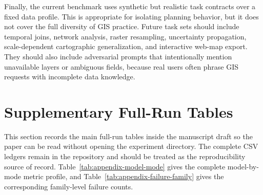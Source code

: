 \documentclass[]{interact}
\begin{document}
Finally, the current benchmark uses synthetic but realistic task contracts over a fixed data profile. This is appropriate for isolating planning behavior, but it does not cover the full diversity of GIS practice. Future task sets should include temporal joins, network analysis, raster resampling, uncertainty propagation, scale-dependent cartographic generalization, and interactive web-map export. They should also include adversarial prompts that intentionally mention unavailable layers or ambiguous fields, because real users often phrase GIS requests with incomplete data knowledge.

\section{Supplementary Full-Run Tables}

This section records the main full-run tables inside the manuscript draft so the paper can be read without opening the experiment directory. The complete CSV ledgers remain in the repository and should be treated as the reproducibility source of record. Table~\ref{tab:appendix-model-mode} gives the complete model-by-mode metric profile, and Table~\ref{tab:appendix-failure-family} gives the corresponding family-level failure counts.
\end{document}
